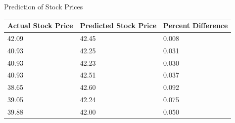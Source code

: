 \documentclass[final,table]{beamer}
\newlength{\twocolwid}
\begin{document}
\begin{frame}[t]
\begin{columns}[t]
\begin{column}{\twocolwid}
\begin{block}{Prediction of Stock Prices}
\begin{table}[ht!]
\begin{tabular}{|l|l|l|}
\hline
\textbf{Actual Stock Price} & \textbf{Predicted Stock Price} & \textbf{Percent Difference} \\ \hline
42.09                       & 42.45                          & 0.008                       \\ \hline
40.93                       & 42.25                          & 0.031                       \\ \hline
40.93                       & 42.23                          & 0.030                       \\ \hline
40.93                       & 42.51                          & 0.037                       \\ \hline
38.65                       & 42.60                          & 0.092                       \\ \hline
39.05                       & 42.24                          & 0.075                       \\ \hline
39.88                       & 42.00                          & 0.050                       \\ \hline
\end{tabular}
\end{table}



\end{block}
\end{column}
\end{columns}
\end{frame}
\end{document}
